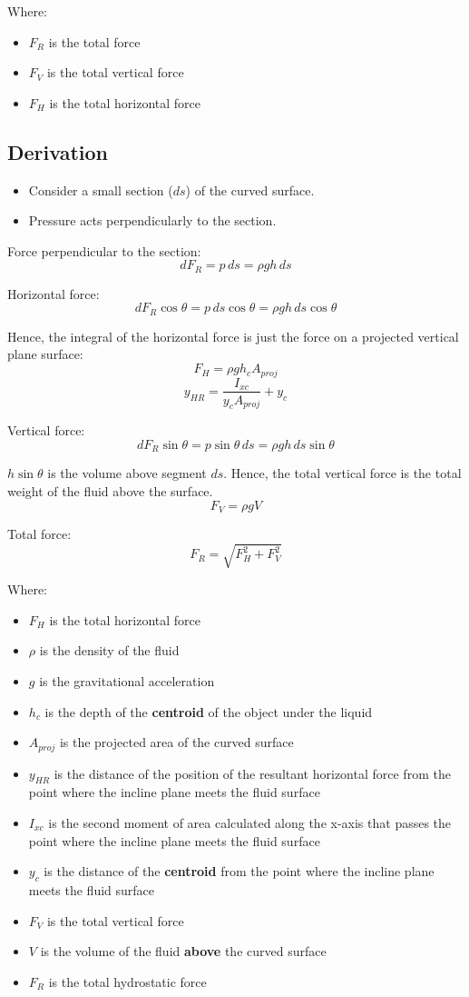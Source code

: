 \documentclass[11pt]{article}
\begin{document}
Where:
\begin{itemize}
\item \(F_R\) is the total force
\item \(F_V\) is the total vertical force
\item \(F_H\) is the total horizontal force
\end{itemize}

\subsection{Derivation}
\label{sec:org3c8b112}
\begin{itemize}
\item Consider a small section (\(ds\)) of the curved surface.
\item Pressure acts perpendicularly to the section.
\end{itemize}

Force perpendicular to the section:
\[dF_R = p \, ds = \rho g h \, ds\]

Horizontal force:
\[dF_R \cos \theta = p \, ds \cos \theta = \rho g h \, ds \cos \theta\]

Hence, the integral of the horizontal force is just the force on a projected vertical plane surface:
\[F_H = \rho g h_c A_{proj}\]
\[y_{HR} = \frac{I_{xc}}{y_c A_{proj}} + y_c\]

Vertical force:
\[dF_R \sin \theta = p \sin \theta \, ds = \rho g h \, ds \sin \theta\]

\(h \sin \theta\) is the volume above segment \(ds\). Hence, the total vertical force is the total weight of the fluid above the surface.
\[F_V = \rho g V\]

Total force:
\[F_R = \sqrt{F_H^2 + F_V^2}\]

\newpage

Where:
\begin{itemize}
\item \(F_H\) is the total horizontal force
\item \(\rho\) is the density of the fluid
\item \(g\) is the gravitational acceleration
\item \(h_c\) is the depth of the \textbf{centroid} of the object under the liquid
\item \(A_{proj}\) is the projected area of the curved surface
\item \(y_{HR}\) is the distance of the position of the resultant horizontal force from the point where the incline plane meets the fluid surface
\item \(I_{xc}\) is the second moment of area calculated along the x-axis that passes the point where the incline plane meets the fluid surface
\item \(y_c\) is the distance of the \textbf{centroid} from the point where the incline plane meets the fluid surface
\item \(F_V\) is the total vertical force
\item \(V\) is the volume of the fluid \textbf{above} the curved surface
\item \(F_R\) is the total hydrostatic force
\end{itemize}
\end{document}
